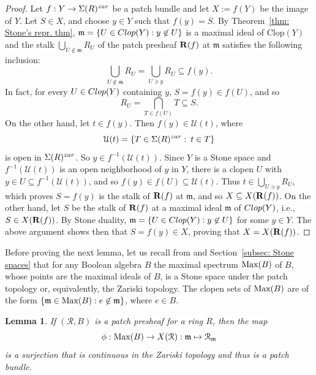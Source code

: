 \documentclass[11pt]{amsart}
\def\m{{\mathfrak m}} %
\newtheorem{lemma}[theorem]{Lemma}
\theoremstyle{definition}
\def\Max{\mbox{\rm Max}}
\def\cal{\mathcal}
\begin{document}
\begin{proof}  
Let $f:Y \rightarrow \Sigma(R)^{\rm zar}$ be a patch bundle and let $X:=f(Y)$ be the  image of $Y$. Let $S \in X$, and choose $y \in Y$ such that $f(y) = S$. By Theorem~\ref{thm: Stone's repr. thm}, $\m=\{U\in {\rm Clop}(Y):y \not \in U\}$ is a maximal ideal of Clop$(Y)$ and the stalk $\bigcup_{U \not \in \m} R_U$  of the patch presheaf ${\bf R}(f)$ at $\m$ satisfies the following inclusion: 
$$ \bigcup_{U \not \in \m} R_U = \bigcup_{U\ni y} R_U \subseteq f(y).$$
In fact, for every $U\in {\rm Clop}(Y)$ containing $y$, $S=f(y)\in f(U)$, and so $$R_U=\bigcap_{T\in f(U)}T\subseteq S.$$
On the other hand, let $t \in f(y)$. Then $f(y) \in {\cal U}(t)$, where $$\mathcal{U}(t)=\{T\in \Sigma(R)^{\rm zar} \, \colon \, t\in T\}$$ is open in $\Sigma(R)^{\rm zar}$. So $y \in f^{-1}({\cal U}(t))$. Since $Y$ is a Stone space and $f^{-1}({\cal U}(t))$ is an open neighborhood of $y$ in  $Y$, there is a clopen $U$ with $y \in U \subseteq f^{-1}({\cal U}(t))$, and so $f(y) \in f(U) \subseteq {\cal U}(t)$. Thus $t \in \bigcup_{U\ni y}R_U$, which proves $S=f(y)$ is the stalk of ${\bf R}(f)$ at $\m$, and so $X\subseteq X({\bf R}(f))$. On the other hand, let $S$ be the stalk of ${\bf R}(f)$ at a maximal ideal $\m$ of ${\rm Clop}(Y)$, i.e., $S\in X({\bf R}(f))$. By Stone duality, $\m=\{U\in {\rm Clop}(Y):y \not \in U\}$ for some $y\in Y$. The above argument shows then that $S=f(y)\in X$, proving that $X = X({\bf R}(f))$. \end{proof}    

Before proving the next lemma, let us recall from \cite[II.3.5]{Joh86} and Section~\ref{subsec: Stone spaces} that for any Boolean algebra $B$ the maximal spectrum $\Max(B)$ of $B$, whose points are the maximal ideals of $B$, is a Stone space under the patch topology or, equivalently, the Zariski topology. The clopen sets of $\Max(B)$ are of the form $\{\m \in \Max(B): e \not \in \m\}$, where $e\in B$. 

\begin{lemma}\label{lem: continous surjection} If $({\cal R}, B)$ is a patch presheaf for a ring $R$, then the map  $$\phi:\Max(B) \rightarrow X({\mathcal R}):{\mathfrak{m}} \mapsto {\mathcal R}_\m$$ is a surjection that is continuous in the Zariski topology and thus is a patch bundle. 
\end{lemma} 
\end{document}
